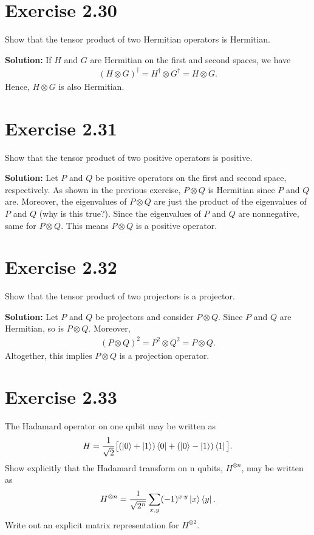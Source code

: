 \documentclass{book}
\begin{document}
\section*{Exercise 2.30}
    Show that the tensor product of two Hermitian operators is Hermitian.
    
    \textbf{Solution:} If $H$ and $G$ are Hermitian on the first and second spaces, we have
    \begin{align}
        (H\otimes G)^\dagger = H^\dagger \otimes G^\dagger = H \otimes G.
    \end{align}
    Hence, $H\otimes G$ is also Hermitian.

\section*{Exercise 2.31}
    Show that the tensor product of two positive operators is positive.
    
    \textbf{Solution:} Let $P$ and $Q$ be positive operators on the first and second space, respectively. As shown in the previous exercise, $P\otimes Q$ is Hermitian since $P$ and $Q$ are. Moreover, the eigenvalues of $P\otimes Q$ are just the product of the eigenvalues of $P$ and $Q$ (why is this true?). Since the eigenvalues of $P$ and $Q$ are nonnegative, same for $P\otimes Q$. This means $P \otimes Q$ is a positive operator. 
    
\section*{Exercise 2.32}
    Show that the tensor product of two projectors is a projector.
    
    \textbf{Solution:} Let $P$ and $Q$ be projectors and consider $P\otimes Q$. Since $P$ and $Q$ are Hermitian, so is $P\otimes Q$. Moreover,
    \begin{align}
        (P \otimes Q)^2 = P^2 \otimes Q^2 = P \otimes Q.
    \end{align}
    Altogether, this implies $P\otimes Q$ is a projection operator.
    
\section*{Exercise 2.33}
    The Hadamard operator on one qubit may be written as
    \begin{align}
        H = \frac{1}{\sqrt{2}}\big[(\ket{0}+\ket{1})\bra{0}+ (\ket{0}-\ket{1})\bra{1}\big].
    \end{align}
    Show explicitly that the Hadamard transform on n qubits, $H^{\otimes n}$, may be written as
    \begin{align}
        H^{\otimes n} = \frac{1}{\sqrt{2^n}} \sum_{x,y} (-1)^{x\cdot y} \ket{x}\bra{y}.
    \end{align}
    Write out an explicit matrix representation for $H^{\otimes 2}$.
    
\end{document}
